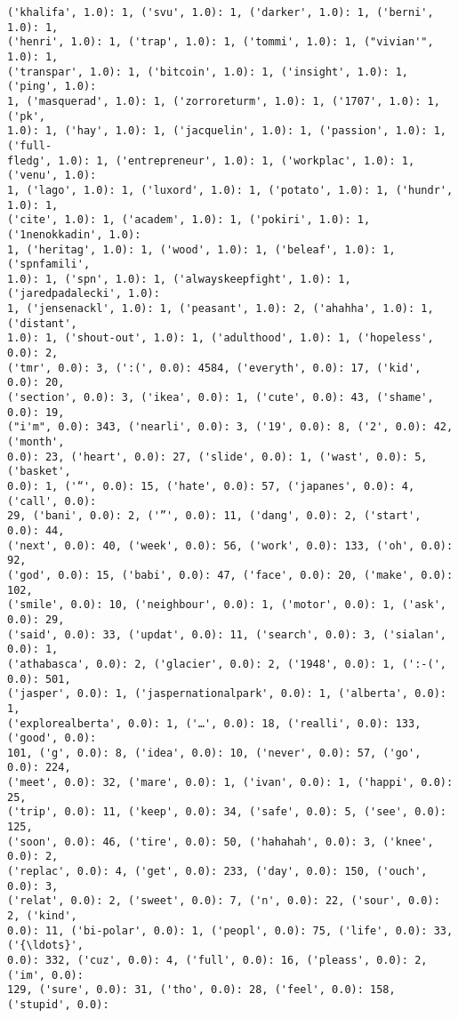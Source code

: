 \documentclass[11pt]{article}
\begin{document}
\begin{Verbatim}[commandchars=\\\{\}]
('khalifa', 1.0): 1, ('svu', 1.0): 1, ('darker', 1.0): 1, ('berni', 1.0): 1,
('henri', 1.0): 1, ('trap', 1.0): 1, ('tommi', 1.0): 1, ("vivian'", 1.0): 1,
('transpar', 1.0): 1, ('bitcoin', 1.0): 1, ('insight', 1.0): 1, ('ping', 1.0):
1, ('masquerad', 1.0): 1, ('zorroreturm', 1.0): 1, ('1707', 1.0): 1, ('pk',
1.0): 1, ('hay', 1.0): 1, ('jacquelin', 1.0): 1, ('passion', 1.0): 1, ('full-
fledg', 1.0): 1, ('entrepreneur', 1.0): 1, ('workplac', 1.0): 1, ('venu', 1.0):
1, ('lago', 1.0): 1, ('luxord', 1.0): 1, ('potato', 1.0): 1, ('hundr', 1.0): 1,
('cite', 1.0): 1, ('academ', 1.0): 1, ('pokiri', 1.0): 1, ('1nenokkadin', 1.0):
1, ('heritag', 1.0): 1, ('wood', 1.0): 1, ('beleaf', 1.0): 1, ('spnfamili',
1.0): 1, ('spn', 1.0): 1, ('alwayskeepfight', 1.0): 1, ('jaredpadalecki', 1.0):
1, ('jensenackl', 1.0): 1, ('peasant', 1.0): 2, ('ahahha', 1.0): 1, ('distant',
1.0): 1, ('shout-out', 1.0): 1, ('adulthood', 1.0): 1, ('hopeless', 0.0): 2,
('tmr', 0.0): 3, (':(', 0.0): 4584, ('everyth', 0.0): 17, ('kid', 0.0): 20,
('section', 0.0): 3, ('ikea', 0.0): 1, ('cute', 0.0): 43, ('shame', 0.0): 19,
("i'm", 0.0): 343, ('nearli', 0.0): 3, ('19', 0.0): 8, ('2', 0.0): 42, ('month',
0.0): 23, ('heart', 0.0): 27, ('slide', 0.0): 1, ('wast', 0.0): 5, ('basket',
0.0): 1, ('“', 0.0): 15, ('hate', 0.0): 57, ('japanes', 0.0): 4, ('call', 0.0):
29, ('bani', 0.0): 2, ('”', 0.0): 11, ('dang', 0.0): 2, ('start', 0.0): 44,
('next', 0.0): 40, ('week', 0.0): 56, ('work', 0.0): 133, ('oh', 0.0): 92,
('god', 0.0): 15, ('babi', 0.0): 47, ('face', 0.0): 20, ('make', 0.0): 102,
('smile', 0.0): 10, ('neighbour', 0.0): 1, ('motor', 0.0): 1, ('ask', 0.0): 29,
('said', 0.0): 33, ('updat', 0.0): 11, ('search', 0.0): 3, ('sialan', 0.0): 1,
('athabasca', 0.0): 2, ('glacier', 0.0): 2, ('1948', 0.0): 1, (':-(', 0.0): 501,
('jasper', 0.0): 1, ('jaspernationalpark', 0.0): 1, ('alberta', 0.0): 1,
('explorealberta', 0.0): 1, ('…', 0.0): 18, ('realli', 0.0): 133, ('good', 0.0):
101, ('g', 0.0): 8, ('idea', 0.0): 10, ('never', 0.0): 57, ('go', 0.0): 224,
('meet', 0.0): 32, ('mare', 0.0): 1, ('ivan', 0.0): 1, ('happi', 0.0): 25,
('trip', 0.0): 11, ('keep', 0.0): 34, ('safe', 0.0): 5, ('see', 0.0): 125,
('soon', 0.0): 46, ('tire', 0.0): 50, ('hahahah', 0.0): 3, ('knee', 0.0): 2,
('replac', 0.0): 4, ('get', 0.0): 233, ('day', 0.0): 150, ('ouch', 0.0): 3,
('relat', 0.0): 2, ('sweet', 0.0): 7, ('n', 0.0): 22, ('sour', 0.0): 2, ('kind',
0.0): 11, ('bi-polar', 0.0): 1, ('peopl', 0.0): 75, ('life', 0.0): 33, ('{\ldots}',
0.0): 332, ('cuz', 0.0): 4, ('full', 0.0): 16, ('pleass', 0.0): 2, ('im', 0.0):
129, ('sure', 0.0): 31, ('tho', 0.0): 28, ('feel', 0.0): 158, ('stupid', 0.0):

\end{Verbatim}
\end{document}
